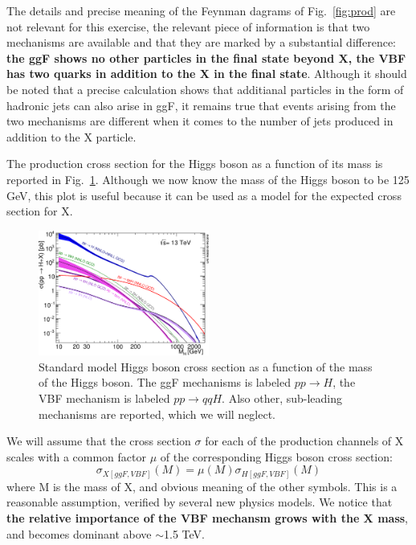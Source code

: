 \documentclass[a4paper,12pt]{article}
\begin{document}
The details and precise meaning of the Feynman dagrams of Fig.~\ref{fig:prod}
are not relevant for this exercise, the relevant piece of information is that
two mechanisms are available and that they are marked by a substantial
difference: {\bf the ggF shows no other particles in the final state beyond X,
the VBF has two quarks in addition to the X in the final state}.
Although it should be noted that a precise calculation shows that additianal
particles in the form of hadronic jets can also arise in ggF, it remains true
that events arising from the two mechanisms are different when it comes to the
number of jets produced in addition to the X particle.

The production cross section for the Higgs boson as a function of its mass is
reported in Fig.~\ref{fig:production}. Although we now know the mass of the
Higgs boson to be 125 GeV, this plot is useful because it can be used as a
model for the expected cross section for X.
\begin{figure}
 \centering 
 \includegraphics[width=0.5\textwidth]{images/plotAll_13tev_BSM_sqrt.png}
 \caption{Standard model Higgs boson cross section as a function of the mass
 of the Higgs boson. The ggF mechanisms is labeled $pp\rightarrow{}H$, the VBF
 mechanism is labeled $pp\rightarrow{}qqH$. Also other, sub-leading mechanisms
 are reported, which we will neglect.\label{fig:production}}
\end{figure}

We will assume that the cross section $\sigma$ for each of the production
channels of X scales with a common factor $\mu$ of the corresponding Higgs
boson cross section: \begin{equation}
 \sigma_{X [ggF,VBF]}(M) = \mu(M)\sigma_{H [ggF,VBF]}(M)
\end{equation}
 where M is the mass of X, and obvious meaning of the other symbols. This is a
 reasonable assumption, verified by several new physics models.  We notice
 that {\bf the relative importance of the VBF mechansm grows with the X mass},
 and becomes dominant above $\sim$1.5 TeV.
 
\end{document}
